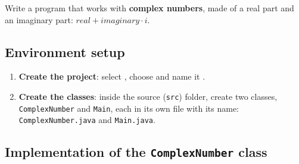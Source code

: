 Write a program that works with \textbf{complex numbers}, made of a real part and an imaginary part: \(real + imaginary \cdot i\).

\subsection{Environment setup}

\begin{enumerate}

    \item \textbf{Create the project}: select , choose  and name it .

    \item \textbf{Create the classes}: inside the source (\texttt{src}) folder, create two classes, \texttt{ComplexNumber} and \texttt{Main}, each in its own file with its name: \texttt{ComplexNumber.java} and \texttt{Main.java}.

\end{enumerate}

\subsection{Implementation of the \texttt{ComplexNumber} class}

